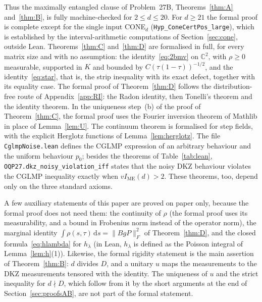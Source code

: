 \documentclass[11pt]{amsart}
\theoremstyle{definition}
\theoremstyle{remark}
\numberwithin{equation}{section}
\newcommand{\C}{\mathbb{C}}
\newcommand{\IME}{I_{\mathrm{ME}}}
\newcommand{\dd}{\,\mathrm{d}}
\begin{document}
Thus the maximally entangled clause of Problem~27B, Theorems~\ref{thm:A} and~\ref{thm:B}, is fully machine-checked for
$2\le d\le20$. For $d\ge21$ the formal proof is complete except for the single input CONE$_d$
(\nolinkurl{Hyp_ConeCertPos_large}), which is established by the interval-arithmetic computations of
Section~\ref{sec:cone}, outside Lean. Theorems~\ref{thm:C} and~\ref{thm:D} are formalised in full, for every matrix size
and with no assumption: the identity~\eqref{eq:2bmv} on $\C^2$, with $\rho\ge0$ measurable, supported in $K$ and bounded
by $C(\tau(1-\tau))^{-1/2}$, and the identity~\eqref{eq:star}, that is, the strip inequality with its exact defect, together
with its equality case. The formal proof of Theorem~\ref{thm:D} follows the distribution-free route of
Appendix~\ref{app:RI}: the Radon identity, then Tonelli's theorem and the identity theorem. In the uniqueness step~(b) of
the proof of Theorem~\ref{thm:C}, the formal proof uses the Fourier inversion theorem of Mathlib in place of
Lemma~\ref{lem:U}. The continuum theorem is formalised for step fields, with the explicit Herglotz functions of
Lemma~\ref{lem:herglotz}. The file \texttt{CglmpNoise.lean} defines the CGLMP expression of an arbitrary behaviour and
the uniform behaviour $p_0$; besides the theorems of Table~\ref{tab:lean}, \nolinkurl{OQP27.dkz_noisy_violation_iff}
states that the noisy DKZ behaviour violates the CGLMP inequality exactly when $v\IME(d)>2$. These theorems, too, depend
only on the three standard axioms.

A few auxiliary statements of this paper are proved on paper only, because the formal proof does not need them: the
continuity of $\rho$ (the formal proof uses its measurability, and a bound in Frobenius norm instead of the operator norm),
the marginal identity $\int\rho(s,\tau)\dd s=\|BgP\|_F^2$ of Theorem~\ref{thm:D}, and the closed formula~\eqref{eq:hlambda}
for $h_\lambda$ (in Lean, $h_\lambda$ is defined as the Poisson integral of Lemma~\ref{lem:h}(1)). Likewise, the formal
rigidity statement is the main assertion of Theorem~\ref{thm:B}: $d$ divides $D$, and a unitary $u$ maps the measurements to
the DKZ measurements tensored with the identity. The uniqueness of $u$ and the strict inequality for $d\nmid D$, which
follow from it by the short arguments at the end of Section~\ref{sec:proofsAB}, are not part of the formal statement.
\end{document}

